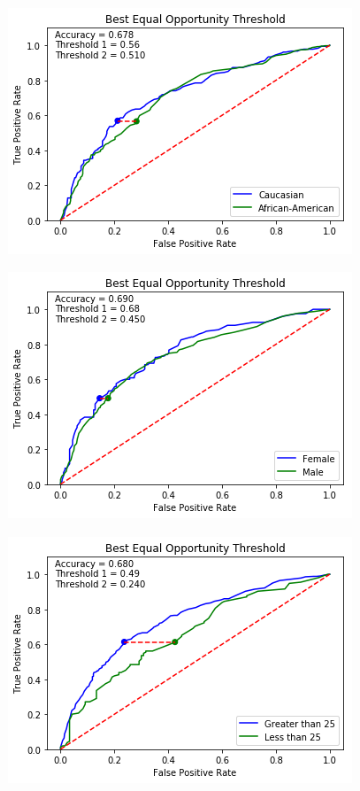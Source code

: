\documentclass[11pt, fleqn, titlepage]{article}
\begin{document}
	\begin{figure}[H]
		\begin{subfigure}{0.5\textwidth}
			\centering
			\includegraphics[width=0.9\linewidth]{"imgs/Equal Opportunity Optimal"}
		\end{subfigure}
		\begin{subfigure}{0.5\textwidth}
			\centering
			\includegraphics[width=0.9\linewidth]{"imgs/Equal Opportunity Optimal_sex"}
		\end{subfigure}	
		\begin{center}
		\begin{subfigure}{0.5\textwidth}
			\centering
			\includegraphics[width=0.9\linewidth]{"imgs/Equal Opportunity Optimal_age"}

\end{subfigure}
\end{center}
\end{figure}
\end{document}
